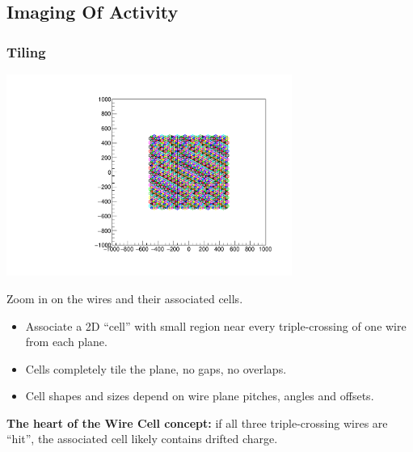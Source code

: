 \documentclass[xcolor=dvipsnames]{beamer}
\begin{document}
\subsection{Imaging Of Activity}

\begin{frame}[fragile]
  \frametitle{Tiling}

  \begin{center}
    \includegraphics[width=0.7\textwidth,trim=8.6cm 9cm 8.6cm 9cm,clip]{test_boundcells.pdf}

    Zoom in on the wires and their associated cells.
  \end{center}



  \footnotesize
  \begin{itemize}
  \item Associate a 2D ``cell'' with small region near every
    triple-crossing of one wire from each plane.
  \item Cells completely tile the plane, no gaps, no overlaps.
  \item Cell shapes and sizes depend on wire plane pitches, angles and
    offsets.
  \end{itemize}

  \textbf{The heart of the Wire Cell concept:} if all three
  triple-crossing wires are ``hit'', the associated cell likely
  contains drifted charge.

\end{frame}
\end{document}
